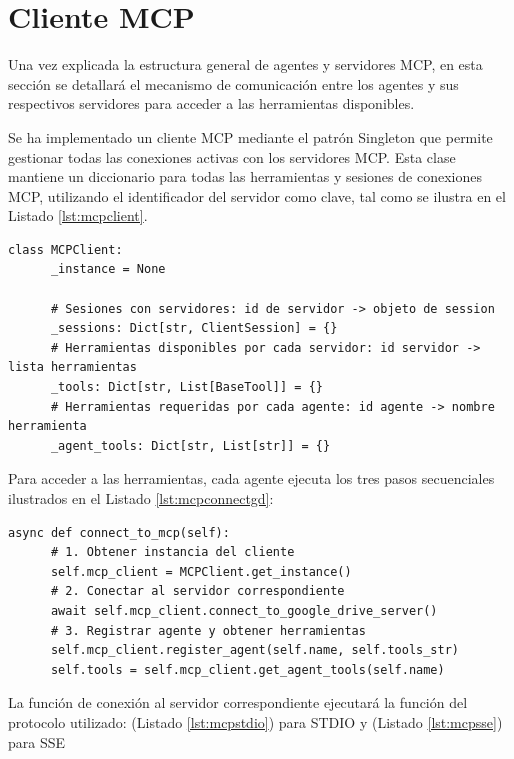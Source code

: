 \section{Cliente MCP}
\label{sec:gestionmcp}
Una vez explicada la estructura general de agentes y servidores MCP, en esta sección se detallará el mecanismo de comunicación entre los agentes y sus respectivos servidores para acceder a las herramientas disponibles.

Se ha implementado un cliente MCP mediante el patrón Singleton que permite gestionar todas las conexiones activas con los servidores MCP. Esta clase mantiene un diccionario para todas las herramientas y sesiones de conexiones MCP, utilizando el identificador del servidor como clave, tal como se ilustra en el Listado \ref{lst:mcpclient}.


\begin{lstlisting}[caption={\protect\opus{mcp_multi_client.py}: clase Singleton MCPClient},label={lst:mcpclient}]
  class MCPClient:
      _instance = None

      # Sesiones con servidores: id de servidor -> objeto de session
      _sessions: Dict[str, ClientSession] = {}
      # Herramientas disponibles por cada servidor: id servidor -> lista herramientas
      _tools: Dict[str, List[BaseTool]] = {}
      # Herramientas requeridas por cada agente: id agente -> nombre herramienta
      _agent_tools: Dict[str, List[str]] = {}
\end{lstlisting}

Para acceder a las herramientas, cada agente ejecuta los tres pasos secuenciales ilustrados en el Listado \ref{lst:mcpconnectgd}:

\begin{lstlisting}[caption={\protect\opus{google_drive_agent_graph.py}: función \protect\opus{connect_to_mcp} en agente Google Drive},label={lst:mcpconnectgd}]
  async def connect_to_mcp(self):
      # 1. Obtener instancia del cliente
      self.mcp_client = MCPClient.get_instance()
      # 2. Conectar al servidor correspondiente  
      await self.mcp_client.connect_to_google_drive_server()
      # 3. Registrar agente y obtener herramientas
      self.mcp_client.register_agent(self.name, self.tools_str)
      self.tools = self.mcp_client.get_agent_tools(self.name)
\end{lstlisting}

La función de conexión al servidor correspondiente ejecutará la función del protocolo utilizado:  (Listado \ref{lst:mcpstdio}) para STDIO y  (Listado \ref{lst:mcpsse}) para SSE

